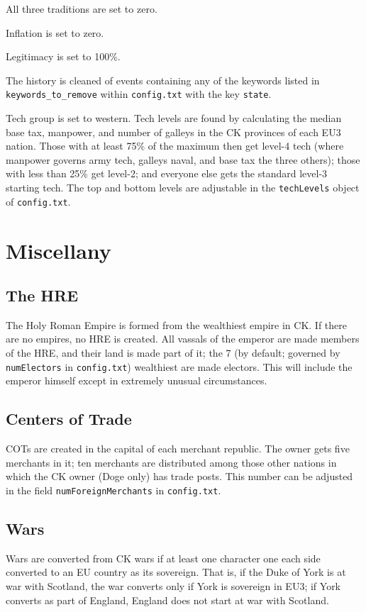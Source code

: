 \documentclass[12pt,ebook,oneside]{book}
\begin{document}
All three traditions are set to zero. 

Inflation is set to zero. 

Legitimacy is set to 100\%. 

The history is cleaned of
events containing any of the keywords listed in
\verb|keywords_to_remove|
within \verb|config.txt| with the key \verb|state|. 

Tech group is set to western. Tech levels are found by calculating the
median base tax, manpower, and number of galleys in the CK provinces
of each EU3 nation. Those with at least 75\% of the maximum then get level-4 tech (where
manpower governs army tech, galleys naval, and base tax the three
others); those with less than 25\% get level-2; and everyone else gets the
standard level-3 starting tech. The top and bottom levels are
adjustable in the \verb|techLevels| object of \verb|config.txt|. 

\chapter{Miscellany}

\section{The HRE}

The Holy Roman Empire is formed from the wealthiest empire in CK. If
there are no empires, no HRE is created. All vassals of the emperor
are made members of the HRE, and their land is made part of it; the 7
(by default; governed by \verb|numElectors| in \verb|config.txt|)
wealthiest are made electors. This will include the emperor himself
except in extremely unusual circumstances. 

\section{Centers of Trade}

COTs are created in the capital of each merchant republic. The owner
gets five merchants in it; ten merchants are distributed among those
other nations in which the CK owner (Doge only) has trade posts. This
number can be adjusted in the field \verb|numForeignMerchants| in
\verb|config.txt|. 

\section{Wars}

Wars are converted from CK wars if at least one character one each
side converted to an EU country as its sovereign. That is, if the Duke
of York is at war with Scotland, the war converts only if York is
sovereign in EU3; if York converts as part of England, England does
not start at war with Scotland. 
\end{document}
